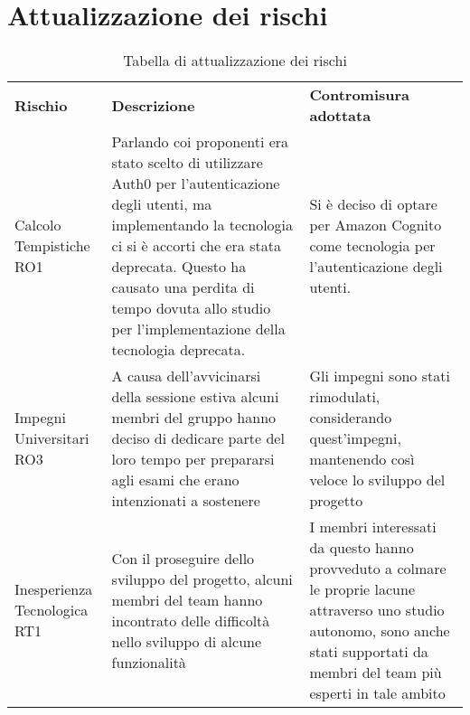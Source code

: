 \section{Attualizzazione dei rischi}
\begin{center}
    \begin{table}[h!]
        \centering
        \caption{Tabella di attualizzazione dei rischi}
        \vspace{5px}
        \renewcommand{\arraystretch}{1.8}
        \begin{tabular}{p{90px} p{160px} p{160px}}
            \rowcolor{logo!70} \textbf{Rischio}   & \textbf{Descrizione}                                                                                                                                                                                                                                                                         & \textbf{Contromisura adottata}                                                                                                                                                                 \\
            Calcolo Tempistiche RO1               & Parlando coi proponenti era stato scelto di utilizzare Auth0 per l'autenticazione degli utenti, ma implementando la tecnologia ci si è accorti che era stata deprecata. \newline Questo ha causato una perdita di tempo dovuta allo studio per l'implementazione della tecnologia deprecata. & Si è deciso di optare per Amazon Cognito come tecnologia per l'autenticazione degli utenti.                                                                                                    \\
            Impegni Universitari RO3              & A causa dell'avvicinarsi della sessione estiva alcuni membri del gruppo hanno deciso di dedicare parte del \newline loro tempo per prepararsi agli esami che erano intenzionati a sostenere                                                                                                  & Gli impegni sono stati rimodulati, considerando quest'impegni, mantenendo così veloce lo sviluppo del progetto                                                                                 \\
            Inesperienza \newline Tecnologica RT1 & Con il proseguire dello sviluppo del progetto, alcuni membri del team hanno incontrato  delle difficoltà nello sviluppo di alcune funzionalità                                                                                                                                               & I membri interessati da questo hanno provveduto a colmare le proprie lacune attraverso uno studio autonomo, \newline sono anche stati supportati da membri del team più esperti in tale ambito \\


\end{tabular}
\end{table}
\end{center}
